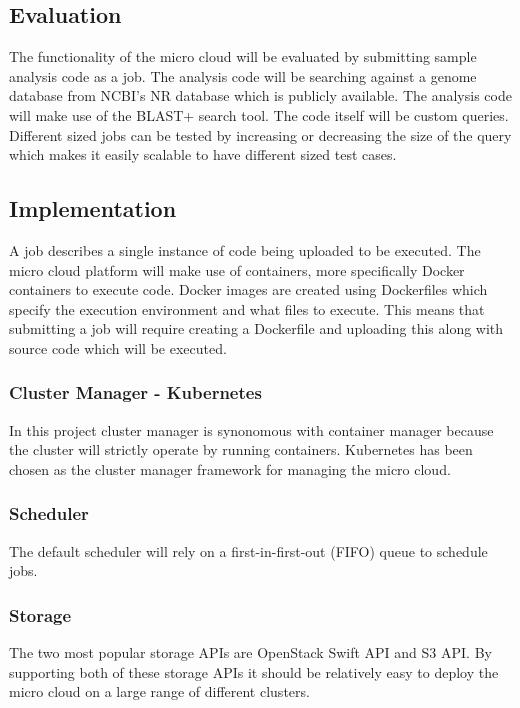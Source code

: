 \documentclass{sig-alternate-05-2015}
\begin{document}
\subsection{Evaluation}
The functionality of the micro cloud will be evaluated by submitting sample analysis code as a job. The analysis code will be searching against a genome database from NCBI's NR database which is publicly available. The analysis code will make use of the BLAST+ search tool. The code itself will be custom queries. Different sized jobs can be tested by increasing or decreasing the size of the query which makes it easily scalable to have different sized test cases.



\subsection{Implementation}


A job describes a single instance of code being uploaded to be executed. 
The micro cloud platform will make use of containers, more specifically Docker containers to execute code. Docker images are created using Dockerfiles which specify the execution environment and what files to execute. This means that submitting a job will require creating a Dockerfile and uploading this along with source code which will be executed. 

\subsubsection{Cluster Manager - Kubernetes}
In this project cluster manager is synonomous with container manager because the cluster will strictly operate by running containers. Kubernetes has been chosen as the cluster manager framework for managing the micro cloud.

\subsubsection{Scheduler}
The default scheduler will rely on a first-in-first-out (FIFO) queue to schedule jobs.

\subsubsection{Storage}
The two most popular storage APIs are OpenStack Swift API and S3 API. By supporting both of these storage APIs it should be relatively easy to deploy the micro cloud on a large range of different clusters.
\end{document}
